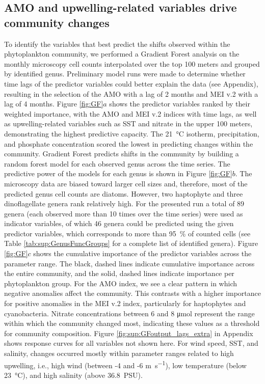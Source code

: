 \documentclass[draft]{agujournal2019}
\begin{document}
\subsection{AMO and upwelling-related variables drive community changes}
    To identify the variables that best predict the shifts observed within the phytoplankton community, we performed a Gradient Forest analysis on the monthly microscopy cell counts interpolated over the top 100 meters and grouped by identified genus. Preliminary model runs were made to determine whether time lags of the predictor variables could better explain the data (see Appendix), resulting in the selection of the AMO with a lag of 2 months and MEI v.2 with a lag of 4 months. Figure \ref{fig:GF}$a$ shows the predictor variables ranked by their weighted importance, with the AMO and MEI v.2 indices with time lags, as well as upwelling-related variables such as SST and nitrate in the upper 100 meters, demonstrating the highest predictive capacity. The \qty{21}{\celsius} isotherm, precipitation, and phosphate concentration scored the lowest in predicting changes within the community. Gradient Forest predicts shifts in the community by building a random forest model for each observed genus across the time series. The predictive power of the models for each genus is shown in Figure \ref{fig:GF}$b$. The microscopy data are biased toward larger cell sizes and, therefore, most of the predicted genus cell counts are diatoms. However, two haptophyte and three dinoflagellate genera rank relatively high. For the presented run a total of 89 genera (each observed more than 10 times over the time series) were used as indicator variables, of which 46 genera could be predicted using the given predictor variables, which corresponds to more than \qty{95}{\%} of counted cells (see Table \ref{tab:sup:GenusFuncGroups} for a complete list of identified genera). 
    Figure \ref{fig:GF}$c$ shows the cumulative importance of the predictor variables across the parameter range. The black, dashed lines indicate cumulative importance across the entire community, and the solid, dashed lines indicate importance per phytoplankton group. For the AMO index, we see a clear pattern in which negative anomalies affect the community. This contrasts with a higher importance for positive anomalies in the MEI v.2 index, particularly for haptophytes and cyanobacteria. Nitrate concentrations between 6 and 8 \unit{\micro \mole} represent the range within which the community changed most, indicating these values as a threshold for community composition. Figure \ref{fig:sup:GFoutput_lags_extra} in Appendix shows response curves for all variables not shown here. For wind speed, SST, and salinity, changes occurred mostly within parameter ranges related to high upwelling, i.e., high wind (between -4 and -6 \unit{m.s^{-1}}), low temperature (below \qty{23}{\celsius}), and high salinity (above \qty{36.8}{PSU}). 
    
\end{document}
